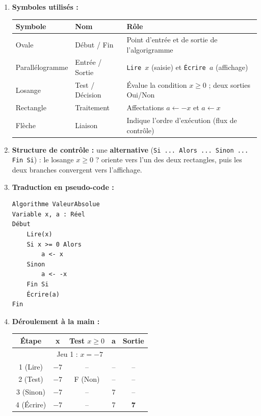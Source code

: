 \documentclass[11pt]{article}
\begin{document}
\begin{corrige}
\begin{enumerate}
\item \textbf{Symboles utilisés :}
\begin{center}
\begin{tabularx}{\linewidth}{|l|X|X|}
\hline
\rowcolor{popblueL} \textbf{Symbole} & \textbf{Nom} & \textbf{Rôle} \\
\hline
Ovale & Début / Fin & Point d'entrée et de sortie de l'algorigramme \\
\hline
Parallélogramme & Entrée / Sortie & \texttt{Lire $x$} (saisie) et \texttt{Écrire $a$} (affichage) \\
\hline
Losange & Test / Décision & Évalue la condition $x \geq 0$ ; deux sorties Oui/Non \\
\hline
Rectangle & Traitement & Affectations $a \leftarrow -x$ et $a \leftarrow x$ \\
\hline
Flèche & Liaison & Indique l'ordre d'exécution (flux de contrôle) \\
\hline
\end{tabularx}
\end{center}
\item \textbf{Structure de contrôle :} une \textbf{alternative} (\texttt{Si ... Alors ... Sinon ... Fin Si}) : le losange $x \geq 0$ ? oriente vers l'un des deux rectangles, puis les deux branches convergent vers l'affichage.
\item \textbf{Traduction en pseudo-code :}
\begin{lstlisting}
Algorithme ValeurAbsolue
Variable x, a : Réel
Début
    Lire(x)
    Si x >= 0 Alors
        a <- x
    Sinon
        a <- -x
    Fin Si
    Écrire(a)
Fin
\end{lstlisting}
\item \textbf{Déroulement à la main :}
\begin{center}
\begin{tabular}{|c|c|c|c|c|}
\hline
\rowcolor{popblueL} \textbf{Étape} & \textbf{x} & \textbf{Test $x \geq 0$} & \textbf{a} & \textbf{Sortie} \\
\hline
\multicolumn{5}{|c|}{\cellcolor{popcream} Jeu 1 : $x = -7$} \\
\hline
1 (Lire) & $-7$ & -- & -- & -- \\
2 (Test) & $-7$ & F (Non) & -- & -- \\
3 (Sinon) & $-7$ & -- & $7$ & -- \\
4 (Écrire) & $-7$ & -- & $7$ & \textbf{7} \\

\end{tabular}
\end{center}
\end{enumerate}
\end{corrige}
\end{document}

